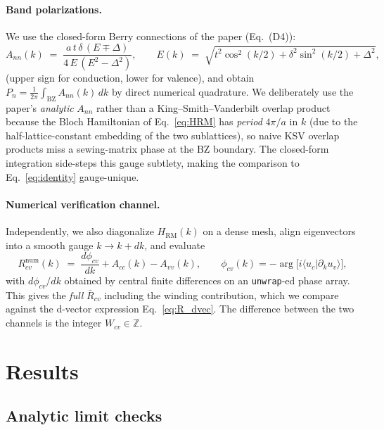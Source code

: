 \documentclass[11pt]{article}
\begin{document}
\paragraph{Band polarizations.}
We use the closed-form Berry connections of the paper (Eq.~(D4)):
\[
  A_{nn}(k)
  \;=\;
  \frac{a\,t\,\delta\,(E\mp\Delta)}{4\,E\,(E^2-\Delta^2)},
  \qquad
  E(k) \;=\; \sqrt{t^2\cos^2(k/2) + \delta^2\sin^2(k/2) + \Delta^2},
\]
(upper sign for conduction, lower for valence), and obtain
$P_n = \frac{1}{2\pi}\int_{\text{BZ}} A_{nn}(k)\,dk$ by direct
numerical quadrature. We deliberately use the paper's
\emph{analytic} $A_{nn}$ rather than a King--Smith--Vanderbilt
overlap product because the Bloch Hamiltonian of Eq.~\eqref{eq:HRM}
has \emph{period} $4\pi/a$ in $k$ (due to the half-lattice-constant
embedding of the two sublattices), so naive KSV overlap products
miss a sewing-matrix phase at the BZ boundary. The closed-form
integration side-steps this gauge subtlety, making the comparison
to Eq.~\eqref{eq:identity} gauge-unique.

\paragraph{Numerical verification channel.}
Independently, we also diagonalize $H_{\text{RM}}(k)$ on a dense
mesh, align eigenvectors into a smooth gauge $k\to k+dk$, and evaluate
\[
  R^{\text{num}}_{cv}(k)
  \;=\;
  \frac{d\phi_{cv}}{dk} + A_{cc}(k) - A_{vv}(k),
  \qquad
  \phi_{cv}(k) = -\arg\bigl[i\langle u_c|\partial_k u_v\rangle\bigr],
\]
with $d\phi_{cv}/dk$ obtained by central finite differences on an
\texttt{unwrap}-ed phase array. This gives the \emph{full}
$\bar{R}_{cv}$ including the winding contribution, which we compare
against the d-vector expression Eq.~\eqref{eq:R_dvec}. The difference
between the two channels is the integer $W_{cv}\in\mathbb{Z}$.

\section{Results}

\subsection{Analytic limit checks}
\end{document}
